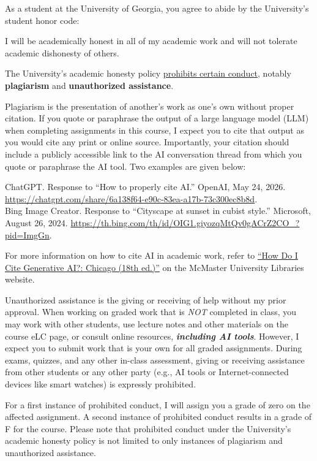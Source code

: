 As a student at the University of Georgia, you agree to abide by the University's student honor code:
\begin{pullquote}
I will be academically honest in all of my academic work and will not tolerate academic dishonesty of others.
\end{pullquote}
The University's academic honesty policy \href{https://honesty.uga.edu/academic-honesty-policy/prohibited-conduct/}{prohibits certain conduct}, notably \textbf{plagiarism} and \textbf{unauthorized assistance}.
\begin{ul}
    \item Plagiarism is the presentation of another's work as one's own without proper citation. If you quote or paraphrase the output of a large language model (LLM) when completing assignments in this course, I expect you to cite that output as you would cite any print or online source. Importantly, your citation should include a publicly accessible link to the AI conversation thread from which you quote or paraphrase the AI tool. Two examples are given below:
    \begin{pullquote}
    ChatGPT. Response to ``How to properly cite AI.'' OpenAI, May 24, 2026. \url{https://chatgpt.com/share/6a138f64-e90c-83ea-a17b-73c300ec8b8d}. \\
    Bing Image Creator. Response to ``Cityscape at sunset in cubist style.'' Microsoft, August 26, 2024. \url{https://th.bing.com/th/id/OIG1.giyozqMtQv0gACrZ2CO\_?pid=ImgGn}.
    \end{pullquote}
    For more information on how to cite AI in academic work, refer to \href{https://libguides.mcmaster.ca/cite-gen-ai/chicago}{``How Do I Cite Generative AI?: Chicago (18th ed.)''} on the McMaster University Libraries website.
    \item Unauthorized assistance is the giving or receiving of help without my prior approval. When working on graded work that is \emph{NOT} completed in class, you may work with other students, use lecture notes and other materials on the course eLC page, or consult online resources, \textbf{\emph{including AI tools}}. However, I expect you to submit work that is your own for all graded assignments. During exams, quizzes, and any other in-class assessment, giving or receiving assistance from other students or any other party (e.g., AI tools or Internet-connected devices like smart watches) is expressly prohibited.
\end{ul}

For a first instance of prohibited conduct, I will assign you a grade of zero on the affected assignment. A second instance of prohibited conduct results in a grade of F for the course. Please note that prohibited conduct under the University's academic honesty policy is not limited to only instances of plagiarism and unauthorized assistance.
